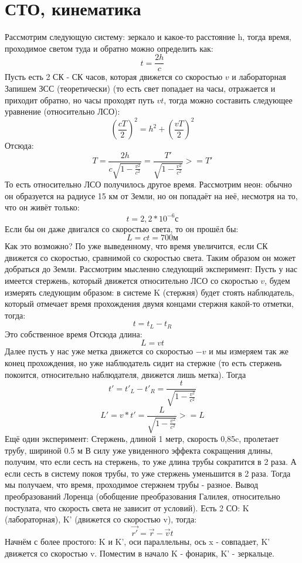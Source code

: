 \section{СТО, кинематика}
Рассмотрим следующую систему: зеркало и какое-то расстояние h, тогда время, проходимое светом туда и обратно можно определить как:
\[t = \frac{2h}{c}\]
Пусть есть 2 СК - СК часов, которая движется со скоростью $v$ и лабораторная
Запишем ЗСС (теоретически) (то есть свет попадает на часы, отражается и приходит обратно, но часы проходят путь $vt$, тогда можно составить следующее уравнение (относительно ЛСО):
\[(\frac{cT}{2})^2 = h^2 + (\frac{vT}{2})^2\]
Отсюда:
\[T = \frac{2h}{c\sqrt{1 - \frac{v^2}{c^2}}} = \frac{T'}{\sqrt{1 - \frac{v^2}{c^2}}} >= T'\]
То есть относительно ЛСО получилось другое время.
Рассмотрим неон: обычно он образуется на радиусе 15 км от Земли, но он попадаёт на неё, несмотря на то, что он живёт только:
\[t = 2,2 * 10^{-6} с\]
Если бы он даже двигался со скоростью света, то он прошёл бы:
\[L = ct = 700 м\]
Как это возможно? По уже выведенному, что время увеличится, если СК движется со скоростью, сравнимой со скоростью света. Таким образом он может добраться до Земли.
Рассмотрим мысленно следующий эксперимент:
Пусть у нас имеется стержень, который движется относительно ЛСО со скоростью $v$, будем измерять следующим образом: в системе K (стержня) будет стоять наблюдатель, который отмечает время прохождения двумя концами стержня какой-то отметки, тогда:
\[t = t_L - t_R\]
Это собственное время
Отсюда длина:
\[L = vt\]
Далее пусть у нас уже метка движется со скоростью $-v$ и мы измеряем так же конец прохождения, но уже наблюдатель сидит на стержне (то есть стержень покоится, относительно наблюдателя, движется лишь метка).
Тогда
\[t' = t'_L - t'_R = \frac{t}{\sqrt{1 - \frac{v^2}{c^2}}}\]
\[L' = v * t' = \frac{L}{\sqrt{1 - \frac{v^2}{c^2}}} >= L\]
Ещё один эксперимент:
Стержень, длиной 1 метр, скорость 0,85c, пролетает трубу, шириной 0.5 м
В силу уже увиденного эффекта сокращения длины, получим, что если сесть на стержень, то уже длина трубы сократится в 2 раза.
А если сесть в систему покоя трубы, то уже стержень уменьшится в 2 раза. Тогда мы получаем, что время, проходимое стержнем трубы - разное.
Вывод преобразований Лоренца (обобщение преобразования Галилея, относительно постулата, что скорость света не зависит от условий).
Есть 2 СО: K (лабораторная), K' (движется со скоростью v), тогда:
\[\Vec{r'} = \Vec{r} - \Vec{v}t\]
Начнём с более простого:
K и K', оси параллельны, ось x - совпадает, K' движется со скоростью v.
Поместим в начало K - фонарик, K' - зеркальце.
